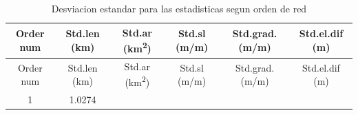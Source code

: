 \documentclass[11pt,]{article}
\begin{document}
\begin{longtable}[]{@{}cccccc@{}}
\caption{\label{estad} Desviacion estandar para las estadisticas segun
orden de red}\tabularnewline
\toprule
\begin{minipage}[b]{0.08\columnwidth}\centering\strut
Order num\strut
\end{minipage} & \begin{minipage}[b]{0.11\columnwidth}\centering\strut
Std.len (km)\strut
\end{minipage} & \begin{minipage}[b]{0.26\columnwidth}\centering\strut
Std.ar (km\textsuperscript{2})\strut
\end{minipage} & \begin{minipage}[b]{0.11\columnwidth}\centering\strut
Std.sl (m/m)\strut
\end{minipage} & \begin{minipage}[b]{0.14\columnwidth}\centering\strut
Std.grad. (m/m)\strut
\end{minipage} & \begin{minipage}[b]{0.13\columnwidth}\centering\strut
Std.el.dif (m)\strut
\end{minipage}\tabularnewline
\midrule
\endfirsthead
\toprule
\begin{minipage}[b]{0.08\columnwidth}\centering\strut
Order num\strut
\end{minipage} & \begin{minipage}[b]{0.11\columnwidth}\centering\strut
Std.len (km)\strut
\end{minipage} & \begin{minipage}[b]{0.26\columnwidth}\centering\strut
Std.ar (km\textsuperscript{2})\strut
\end{minipage} & \begin{minipage}[b]{0.11\columnwidth}\centering\strut
Std.sl (m/m)\strut
\end{minipage} & \begin{minipage}[b]{0.14\columnwidth}\centering\strut
Std.grad. (m/m)\strut
\end{minipage} & \begin{minipage}[b]{0.13\columnwidth}\centering\strut
Std.el.dif (m)\strut
\end{minipage}\tabularnewline
\midrule
\endhead
\begin{minipage}[t]{0.08\columnwidth}\centering\strut
1\strut
\end{minipage} & \begin{minipage}[t]{0.11\columnwidth}\centering\strut
1.0274\strut

\end{minipage}
\end{longtable}
\end{document}
